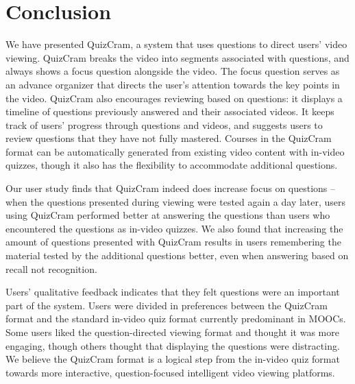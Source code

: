 \documentclass{sigchi}
\begin{document}
\section{Conclusion}

We have presented QuizCram, a system that uses questions to direct users' video viewing. QuizCram breaks the video into segments associated with questions, and always shows a focus question alongside the video. The focus question serves as an advance organizer that directs the user's attention towards the key points in the video. QuizCram also encourages reviewing based on questions: it displays a timeline of questions previously answered and their associated videos. It keeps track of users' progress through questions and videos, and suggests users to review questions that they have not fully mastered. Courses in the QuizCram format can be automatically generated from existing video content with in-video quizzes, though it also has the flexibility to accommodate additional questions.

Our user study finds that QuizCram indeed does increase focus on questions -- when the questions presented during viewing were tested again a day later, users using QuizCram performed better at answering the questions than users who encountered the questions as in-video quizzes. We also found that increasing the amount of questions presented with QuizCram results in users remembering the material tested by the additional questions better, even when answering based on recall not recognition.

Users' qualitative feedback indicates that they felt questions were an important part of the system. Users were divided in preferences between the QuizCram format and the standard in-video quiz format currently predominant in MOOCs. Some users liked the question-directed viewing format and thought it was more engaging, though others thought that displaying the questions were distracting. We believe the QuizCram format is a logical step from the in-video quiz format towards more interactive, question-focused intelligent video viewing platforms.


%
%
%
%
%
\balance



\end{document}
